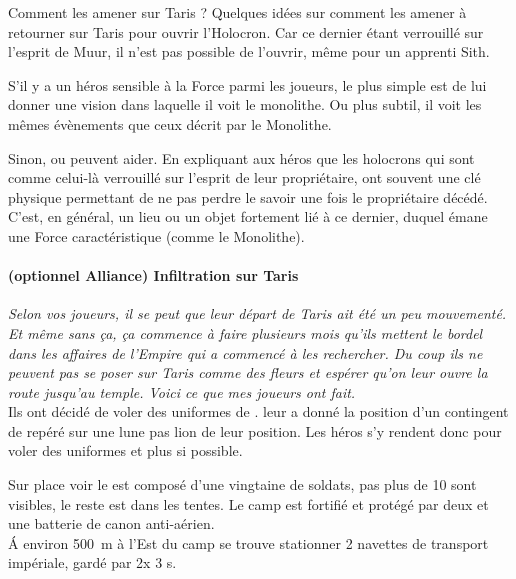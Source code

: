 \begin{samepage}
\begin{paperbox}{Comment les amener sur Taris ?}
    Quelques idées sur comment les amener à retourner sur Taris pour ouvrir l’Holocron. Car ce dernier étant verrouillé sur l’esprit de Muur, il n’est pas possible de l’ouvrir, même pour un apprenti Sith.

    \begin{rebelist}
        \item S’il y a un héros sensible à la Force parmi les joueurs, le plus simple est de lui donner une vision dans laquelle il voit le monolithe. Ou plus subtil, il voit les mêmes évènements que ceux décrit par le Monolithe.
        \item Sinon,  ou  peuvent aider. En expliquant aux héros que les holocrons qui sont comme celui-là verrouillé sur l’esprit de leur propriétaire, ont souvent une clé physique permettant de ne pas perdre le savoir une fois le propriétaire décédé. C’est, en général, un lieu ou un objet fortement lié à ce dernier, duquel émane une Force caractéristique (comme le Monolithe).
    \end{rebelist}
\end{paperbox}
\end{samepage}

\paragraph{(optionnel Alliance) Infiltration sur Taris}
\textit{Selon vos joueurs, il se peut que leur départ de Taris ait été un peu mouvementé. Et même sans ça, ça commence à faire plusieurs mois qu’ils mettent le bordel dans les affaires de l’Empire qui a commencé à les rechercher. Du coup ils ne peuvent pas se poser sur Taris comme des fleurs et espérer qu’on leur ouvre la route jusqu’au temple. Voici ce que mes joueurs ont fait.}\\ 

Ils ont décidé de voler des uniformes de .  leur a donné la position d’un contingent de  repéré sur une lune pas lion de leur position. Les héros s’y rendent donc pour voler des uniformes et plus si possible.

Sur place voir le  est composé d’une vingtaine de soldats, pas plus de 10 sont visibles, le reste est dans les tentes. Le camp est fortifié et protégé par deux  et une batterie de canon anti-aérien.\\ 
\'A environ 500~m à l’Est du camp se trouve stationner 2 navettes de transport impériale, gardé par 2x 3 s.

